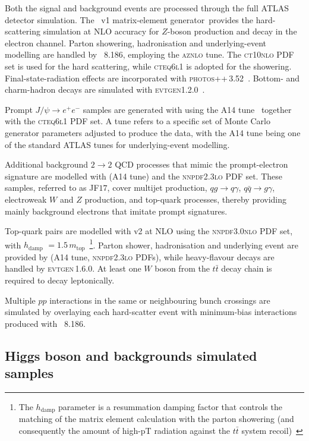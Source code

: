 Both the signal and background events are processed through the full ATLAS detector simulation.
The \powhegbox~v1 matrix-element generator\ provides the hard-scattering simulation at NLO accuracy for $Z$-boson production and decay in the electron channel.  Parton showering, hadronisation and underlying-event modelling are handled by \pythia~8.186, employing the \textsc{aznlo} tune. The \textsc{ct10nlo} PDF set is used for the hard scattering, while \textsc{cteq6l1} is adopted for the showering.
Final-state-radiation effects are incorporated with \textsc{photos++}\,3.52~\cite{davidson2015photosinterfacectechnical,Golonka_2006}.  Bottom- and charm-hadron decays are simulated with \textsc{evtgen}1.2.0~\cite{LANGE2001152}.

Prompt $J/\psi\!\to e^{+}e^{-}$ samples are generated with  using the A14 tune~\cite{A14} together with the \textsc{cteq6l1} PDF set. A tune refers to a specific set of Monte Carlo generator parameters adjusted to produce the data, with the A14 tune being one of the standard ATLAS tunes for underlying-event modelling.

Additional background $2\!\to\!2$ QCD processes that mimic the prompt-electron signature are modelled with  (A14 tune) and the \textsc{nnpdf2.3lo} PDF set. These samples, referred to as JF$17$, cover multijet production, $qg\rightarrow q\gamma$, $q\bar{q}\rightarrow g\gamma$, electroweak $W$ and $Z$ production, and top-quark processes, thereby providing mainly background electrons that imitate prompt signatures.

Top-quark pairs are modelled with \powhegbox v2 at NLO using the \textsc{nnpdf3.0nlo} PDF set, with $h_{\text{damp}}$ $=1.5\,m_{\text{top}}$~\footnote{The $h_{\text{damp}}$ parameter is a resummation damping factor that controls the matching of the matrix element calculation with the parton showering (and consequently the amount of high-pT radiation against the $t\bar{t}$ system recoil)~\cite{hdamp}}.
Parton shower, hadronisation and underlying event are provided by  (A14 tune, \textsc{nnpdf2.3lo} PDFs), while heavy-flavour decays are handled by \textsc{evtgen}\,1.6.0.  At least one $W$ boson from the $t\bar t$ decay chain is required to decay leptonically.

Multiple $pp$ interactions in the same or neighbouring bunch crossings are simulated by overlaying each hard-scatter event with minimum-bias interactions produced with \pythia~8.186.

\subsection{Higgs boson and backgrounds simulated samples}
\label{subsec:higgs_mc}

